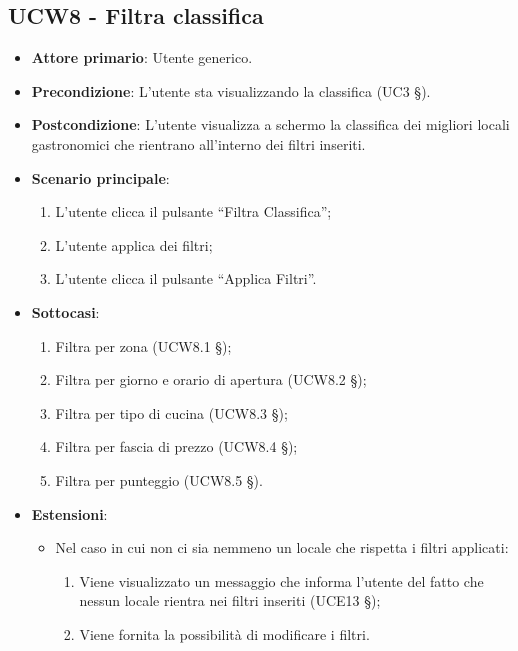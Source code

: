 \subsection{UCW8 - Filtra classifica}

\begin{itemize}
    \item \textbf{Attore primario}: Utente generico.
    \item \textbf{Precondizione}: L’utente sta visualizzando la classifica (UC3 §).
    \item \textbf{Postcondizione}: L’utente visualizza a schermo la classifica dei migliori locali gastronomici che rientrano all’interno dei filtri inseriti.
    \item \textbf{Scenario principale}: 
    \begin{enumerate}
        \item L’utente clicca il pulsante “Filtra Classifica”;
        \item L’utente applica dei filtri;
        \item L’utente clicca il pulsante “Applica Filtri”.
    \end{enumerate}

    \item \textbf{Sottocasi}:
    \begin{enumerate}
        \item Filtra per zona (UCW8.1 §);
        \item Filtra per giorno e orario di apertura (UCW8.2 §);
        \item Filtra per tipo di cucina (UCW8.3 §);
        \item Filtra per fascia di prezzo (UCW8.4 §);
        \item Filtra per punteggio (UCW8.5 §).
    \end{enumerate}

    \item \textbf{Estensioni}:
    \begin{itemize}
        \item Nel caso in cui non ci sia nemmeno un locale che rispetta i filtri applicati:
        \begin{enumerate}
            \item Viene visualizzato un messaggio che informa l’utente del fatto che nessun locale rientra nei filtri inseriti (UCE13 §);
            \item Viene fornita la possibilità di modificare i filtri.
        \end{enumerate}
    \end{itemize}
\end{itemize}

